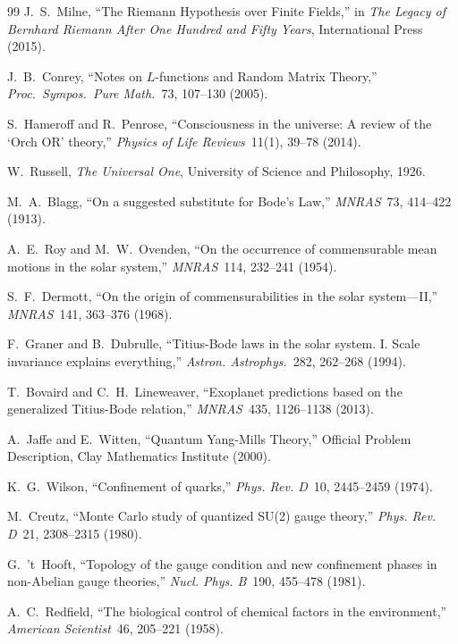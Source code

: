 \begin{thebibliography}{99}
 J.~S.~Milne, ``The Riemann Hypothesis over Finite Fields,'' in \emph{The Legacy of Bernhard Riemann After One Hundred and Fifty Years}, International Press (2015).

 J.~B.~Conrey, ``Notes on $L$-functions and Random Matrix Theory,'' \emph{Proc.\ Sympos.\ Pure Math.}\ 73, 107--130 (2005).

 S.~Hameroff and R.~Penrose, ``Consciousness in the universe: A review of the `Orch OR' theory,'' \emph{Physics of Life Reviews}\ 11(1), 39--78 (2014).

 W.~Russell, \emph{The Universal One}, University of Science and Philosophy, 1926.

 M.~A.~Blagg, ``On a suggested substitute for Bode's Law,'' \emph{MNRAS}\ 73, 414--422 (1913).

 A.~E.~Roy and M.~W.~Ovenden, ``On the occurrence of commensurable mean motions in the solar system,'' \emph{MNRAS}\ 114, 232--241 (1954).

 S.~F.~Dermott, ``On the origin of commensurabilities in the solar system---II,'' \emph{MNRAS}\ 141, 363--376 (1968).

 F.~Graner and B.~Dubrulle, ``Titius-Bode laws in the solar system. I. Scale invariance explains everything,'' \emph{Astron. Astrophys.}\ 282, 262--268 (1994).

 T.~Bovaird and C.~H.~Lineweaver, ``Exoplanet predictions based on the generalized Titius-Bode relation,'' \emph{MNRAS}\ 435, 1126--1138 (2013).

 A.~Jaffe and E.~Witten, ``Quantum Yang-Mills Theory,'' Official Problem Description, Clay Mathematics Institute (2000).

 K.~G.~Wilson, ``Confinement of quarks,'' \emph{Phys. Rev. D}\ 10, 2445--2459 (1974).

 M.~Creutz, ``Monte Carlo study of quantized SU(2) gauge theory,'' \emph{Phys. Rev. D}\ 21, 2308--2315 (1980).

 G.~'t~Hooft, ``Topology of the gauge condition and new confinement phases in non-Abelian gauge theories,'' \emph{Nucl. Phys. B}\ 190, 455--478 (1981).

 A.~C.~Redfield, ``The biological control of chemical factors in the environment,'' \emph{American Scientist}\ 46, 205--221 (1958).


\end{thebibliography}
